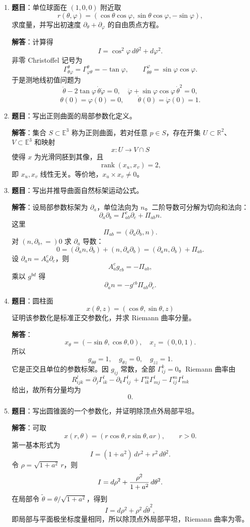 \documentclass[UTF8,12pt,a4paper]{ctexart}
\newcommand{\E}{\mathbb E}
\newcommand{\R}{\mathbb R}
\newcommand{\inner}[2]{\left(#1,#2\right)}
\newcommand{\rank}{\operatorname{rank}}
\begin{document}
\begin{enumerate}
\item \textbf{题目}：单位球面在 $(1,0,0)$ 附近取
\[
r(\theta,\varphi)=(\cos\theta\cos\varphi,\sin\theta\cos\varphi,-\sin\varphi),
\]
求度量，并写出初速度 $\partial_\theta+\partial_\varphi$ 的自由质点方程。

\textbf{解答}：计算得
\[
I=\cos^2\varphi\,d\theta^2+d\varphi^2.
\]
非零 Christoffel 记号为
\[
\Gamma^\theta_{\theta\varphi}=\Gamma^\theta_{\varphi\theta}=-\tan\varphi,\qquad
\Gamma^\varphi_{\theta\theta}=\sin\varphi\cos\varphi.
\]
于是测地线初值问题为
\[
\boxed{\ddot\theta-2\tan\varphi\,\dot\theta\dot\varphi=0,\quad
\ddot\varphi+\sin\varphi\cos\varphi\,\dot\theta^2=0,}
\]
\[
\theta(0)=\varphi(0)=0,\qquad \dot\theta(0)=\dot\varphi(0)=1.
\]

\item \textbf{题目}：写出正则曲面的局部参数化定义。

\textbf{解答}：集合 $S\subset\E^3$ 称为正则曲面，若对任意 $p\in S$，存在开集 $U\subset\R^2$、$V\subset\E^3$ 和映射
\[
x:U\to V\cap S
\]
使得 $x$ 为光滑同胚到其像，且
\[
\rank(x_u,x_v)=2,
\]
即 $x_u,x_v$ 线性无关。等价地，$x_u\times x_v\ne0$。

\item \textbf{题目}：写出并推导曲面自然标架运动公式。

\textbf{解答}：设局部参数标架为 $\partial_a$，单位法向为 $n$。二阶导数可分解为切向和法向：
\[
\boxed{\partial_a\partial_b=\Gamma^c_{ab}\partial_c+\Pi_{ab}n.}
\]
这里
\[
\Pi_{ab}=\inner{\partial_a\partial_b}{n}.
\]
对 $\inner{n,\partial_b}=0$ 求 $\partial_a$ 导数：
\[
0=\inner{\partial_an}{\partial_b}+\inner{n}{\partial_a\partial_b}
=\inner{\partial_an}{\partial_b}+\Pi_{ab}.
\]
设 $\partial_an=A^c_a\partial_c$，则
\[
A^c_ag_{cb}=-\Pi_{ab},
\]
乘以 $g^{bd}$ 得
\[
\boxed{\partial_an=-g^{cb}\Pi_{ab}\partial_c.}
\]

\item \textbf{题目}：圆柱面
\[
x(\theta,z)=(\cos\theta,\sin\theta,z)
\]
证明该参数化是标准正交参数化，并求 Riemann 曲率分量。

\textbf{解答}：
\[
x_\theta=(-\sin\theta,\cos\theta,0),\quad x_z=(0,0,1).
\]
所以
\[
g_{\theta\theta}=1,\quad g_{\theta z}=0,\quad g_{zz}=1.
\]
它是正交且单位的参数标架。因 $g_{ij}$ 常数，全部 $\Gamma^k_{ij}=0$。Riemann 曲率由
\[
R^l_{ijk}=\partial_j\Gamma^l_{ik}-\partial_k\Gamma^l_{ij}
\,+\Gamma^m_{ik}\Gamma^l_{mj}-\Gamma^m_{ij}\Gamma^l_{mk}
\]
给出，故所有分量均为
\[
\boxed{0.}
\]

\item \textbf{题目}：写出圆锥面的一个参数化，并证明除顶点外局部平坦。

\textbf{解答}：可取
\[
x(r,\theta)=(r\cos\theta,r\sin\theta,ar),\qquad r>0.
\]
第一基本形式为
\[
I=(1+a^2)\,dr^2+r^2\,d\theta^2.
\]
令 $\rho=\sqrt{1+a^2}\,r$，则
\[
I=d\rho^2+{\rho^2\over1+a^2}\,d\theta^2.
\]
在局部令 $\tilde\theta=\theta/\sqrt{1+a^2}$，得到
\[
I=d\rho^2+\rho^2\,d\tilde\theta^2,
\]
即局部与平面极坐标度量相同，所以除顶点外局部平坦，Riemann 曲率为零。
\end{enumerate}
\end{document}
